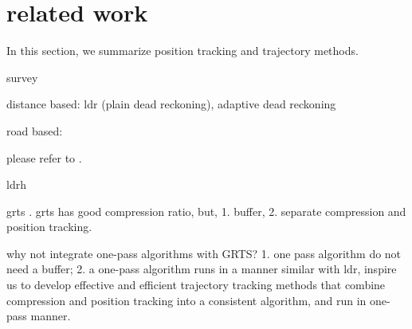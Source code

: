 
\section{related work}
\label{sec-related}

In this section, we summarize position tracking and trajectory methods. 



survey \cite{Leonhardi:Comparison} 

distance based: ldr (plain dead reckoning)\cite{Wolfson:PlainDR}, adaptive dead reckoning \cite{Wolfson:PositionTracking, Lam:AdaptiveDR} %

road based\cite{Wolfson:RoadTracking, Civilis:Techniques}: 


please refer to \cite{Lin:Cised, Zhang:Evaluation}.


ldrh \cite{Trajcevski:LDRH}

grts \cite{Lange:GRTS, Lange:Tracking}. 
grts has good compression ratio, but, 1. buffer, 2. separate compression and position tracking.

why not integrate one-pass algorithms with GRTS? 
1. one pass algorithm do not need a buffer; 2. a one-pass algorithm runs in a manner similar with ldr, 
inspire us to develop effective and efficient trajectory tracking methods that combine compression and position tracking into a consistent algorithm, and run in one-pass manner. 




